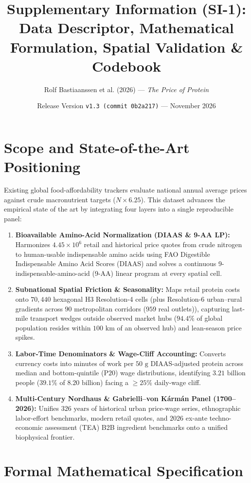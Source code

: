 \documentclass[11pt,a4paper]{article}
\title{\textbf{Supplementary Information (SI-1):} \\ Data Descriptor, Mathematical Formulation, Spatial Validation \& Codebook}
\author{Rolf Bastiaanssen et al. (2026) --- \textit{The Price of Protein}}
\date{Release Version \texttt{v1.3 (commit 0b2a217)} --- November 2026}
\begin{document}
\maketitle

\section{Scope and State-of-the-Art Positioning}
Existing global food-affordability trackers evaluate national annual average prices against crude macronutrient targets ($N \times 6.25$). This dataset advances the empirical state of the art by integrating four layers into a single reproducible panel:
\begin{enumerate}
    \item \textbf{Bioavailable Amino-Acid Normalization (DIAAS \& 9-AA LP):} Harmonizes $4.45 \times 10^6$ retail and historical price quotes from crude nitrogen to human-usable indispensable amino acids using FAO Digestible Indispensable Amino Acid Scores (DIAAS) and solves a continuous 9-indispensable-amino-acid (9-AA) linear program at every spatial cell.
    \item \textbf{Subnational Spatial Friction \& Seasonality:} Maps retail protein costs onto $70{,}440$ hexagonal H3 Resolution-4 cells (plus Resolution-6 urban--rural gradients across $90$ metropolitan corridors ($959$ real outlets)), capturing last-mile transport wedges outside observed market hubs ($94.4\%$ of global population resides within $100\text{ km}$ of an observed hub) and lean-season price spikes.
    \item \textbf{Labor-Time Denominators \& Wage-Cliff Accounting:} Converts currency costs into minutes of work per $50\text{ g}$ DIAAS-adjusted protein across median and bottom-quintile ($\text{P20}$) wage distributions, identifying $3.21\text{ billion}$ people ($39.1\%$ of $8.20\text{ billion}$) facing a $\ge 25\%$ daily-wage cliff.
    \item \textbf{Multi-Century Nordhaus \& Gabrielli--von K\'arm\'an Panel (1700--2026):} Unifies $326\text{ years}$ of historical urban price-wage series, ethnographic labor-effort benchmarks, modern retail quotes, and $2026$ ex-ante techno-economic assessment (TEA) B2B ingredient benchmarks onto a unified biophysical frontier.
\end{enumerate}

\section{Formal Mathematical Specification}
\end{document}
